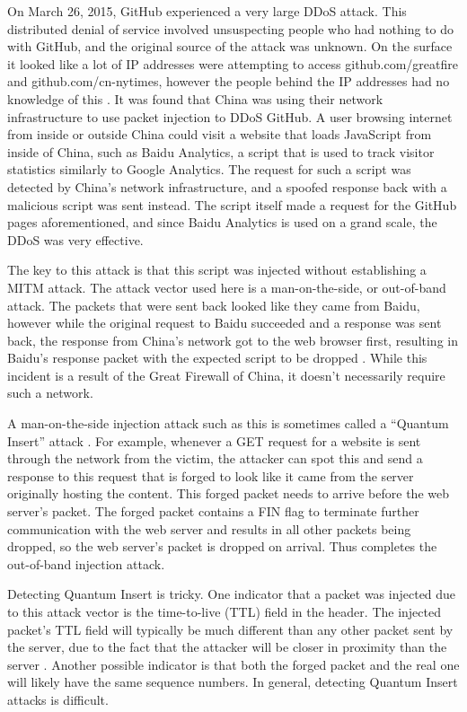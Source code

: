\documentclass[journal]{IEEEtran}
\begin{document}
On March 26, 2015, GitHub experienced a very large DDoS attack. This distributed denial of service involved unsuspecting people who had nothing to do with GitHub, and the original source of the attack was unknown. On the surface it looked like a lot of IP addresses were attempting to access github.com/greatfire and github.com/cn-nytimes, however the people behind the IP addresses had no knowledge of this \cite{china}. It was found that China was using their network infrastructure to use packet injection to DDoS GitHub. A user browsing internet from inside or outside China could visit a website that loads JavaScript from inside of China, such as Baidu Analytics, a script that is used to track visitor statistics similarly to Google Analytics. The request for such a script was detected by China's network infrastructure, and a spoofed response back with a malicious script was sent instead. The script itself made a request for the GitHub pages aforementioned, and since Baidu Analytics is used on a grand scale, the DDoS was very effective.

The key to this attack is that this script was injected without establishing a MITM attack. The attack vector used here is a man-on-the-side, or out-of-band attack. The packets that were sent back looked like they came from Baidu, however while the original request to Baidu succeeded and a response was sent back, the response from China's network got to the web browser first, resulting in Baidu's response packet with the expected script to be dropped \cite{china}. While this incident is a result of the Great Firewall of China, it doesn't necessarily require such a network.	

A man-on-the-side injection attack such as this is sometimes called a “Quantum Insert” attack \cite{MOTS}. For example, whenever a GET request for a website is sent through the network from the victim, the attacker can spot this and send a response to this request that is forged to look like it came from the server originally hosting the content. This forged packet needs to arrive before the web server's packet. The forged packet contains a FIN flag to terminate further communication with the web server and results in all other packets being dropped, so the web server's packet is dropped on arrival. Thus completes the out-of-band injection attack.

Detecting Quantum Insert is tricky. One indicator that a packet was injected due to this attack vector is the time-to-live (TTL) field in the header. The injected packet's TTL field will typically be much different than any other packet sent by the server, due to the fact that the attacker will be closer in proximity than the server \cite{MOTS}. Another possible indicator is that both the forged packet and the real one will likely have the same sequence numbers. In general, detecting Quantum Insert attacks is difficult.
\end{document}
